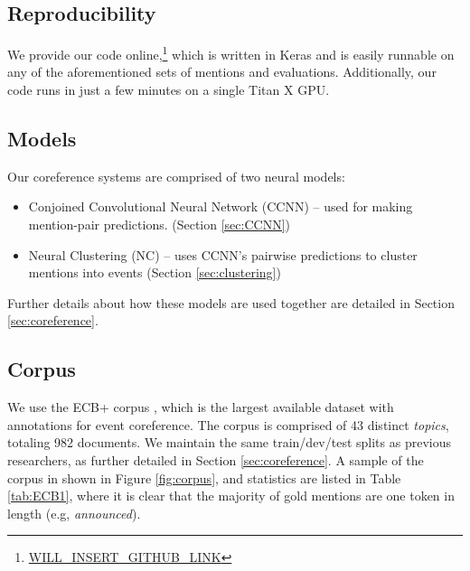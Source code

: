 \documentclass[11pt,a4paper]{article}
\begin{document}
\subsection{Reproducibility}
We provide our code online,\footnote{\url{WILL_INSERT_GITHUB_LINK}} which is written in Keras \cite{chollet2015} and is easily runnable on any of the aforementioned sets of mentions and evaluations.  Additionally, our code runs in just a few minutes on a single Titan X GPU.

\subsection{Models}
Our coreference systems are comprised of two neural models:
\begin{itemize}
  \item Conjoined Convolutional Neural Network (CCNN) -- used for making mention-pair predictions.  (Section \ref{sec:CCNN})
  \item Neural Clustering (NC) -- uses CCNN's pairwise predictions to cluster mentions into events (Section \ref{sec:clustering})
\end{itemize}

Further details about how these models are used together are detailed in Section \ref{sec:coreference}.

\subsection{Corpus}
\label{sec:corpus}
We use the ECB+ corpus \cite{ECB+}, which is the largest available dataset with annotations for event coreference.  The corpus is comprised of 43 distinct \textit{topics}, totaling 982 documents.  We maintain the same train/dev/test splits as previous researchers, as further detailed in Section \ref{sec:coreference}.  A sample of the corpus in shown in Figure \ref{fig:corpus}, and statistics are listed in Table \ref{tab:ECB1}, where it is clear that the majority of gold mentions are one token in length (e.g, \textit{announced}).
\end{document}
